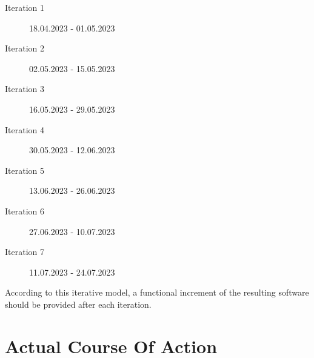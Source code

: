 \begin{multicols}{2}
\begin{description}
    \item[Iteration 1] 18.04.2023 - 01.05.2023
    \item[Iteration 2] 02.05.2023 - 15.05.2023
    \item[Iteration 3] 16.05.2023 - 29.05.2023
    \item[Iteration 4] 30.05.2023 - 12.06.2023
\end{description}
\begin{description}
    \item[Iteration 5] 13.06.2023 - 26.06.2023
    \item[Iteration 6] 27.06.2023 - 10.07.2023
    \item[Iteration 7] 11.07.2023 - 24.07.2023
\end{description}
\end{multicols}

\noindent According to this iterative model, a functional increment of the resulting software should be provided after each iteration.

\section{Actual Course Of Action}
\label{ch:Approach:sec:Actual Course Of Action}

